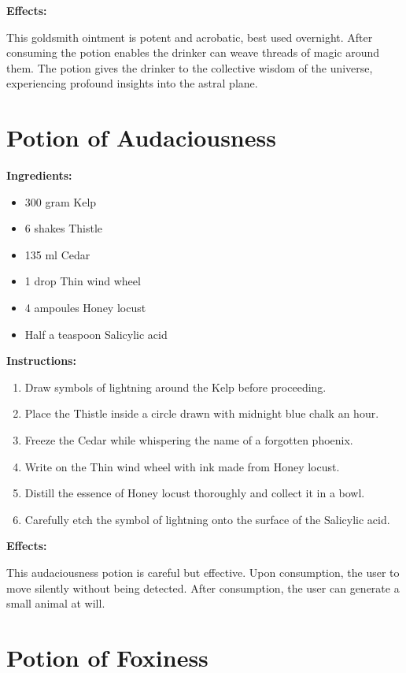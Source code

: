 \documentclass{article}
\begin{document}
\textbf{Effects:}

This goldsmith ointment is potent and acrobatic, best used overnight. After consuming the potion enables the drinker can weave threads of magic around them. The potion gives the drinker to the collective wisdom of the universe, experiencing profound insights into the astral plane.

\newpage
\section*{Potion of Audaciousness}

\textbf{Ingredients:}

\begin{itemize}
  \item 300 gram Kelp
  \item 6 shakes Thistle
  \item 135 ml Cedar
  \item 1 drop Thin wind wheel
  \item 4 ampoules Honey locust
  \item Half a teaspoon Salicylic acid
\end{itemize}

\textbf{Instructions:}

\begin{enumerate}
  \item Draw symbols of lightning around the Kelp before proceeding.
  \item Place the Thistle inside a circle drawn with midnight blue chalk an hour.
  \item Freeze the Cedar while whispering the name of a forgotten phoenix.
  \item Write on the Thin wind wheel with ink made from Honey locust.
  \item Distill the essence of Honey locust thoroughly and collect it in a bowl.
  \item Carefully etch the symbol of lightning onto the surface of the Salicylic acid.
\end{enumerate}

\textbf{Effects:}

This audaciousness potion is careful but effective. Upon consumption, the user to move silently without being detected. After consumption, the user can generate a small animal at will.

\newpage
\section*{Potion of Foxiness}
\end{document}

